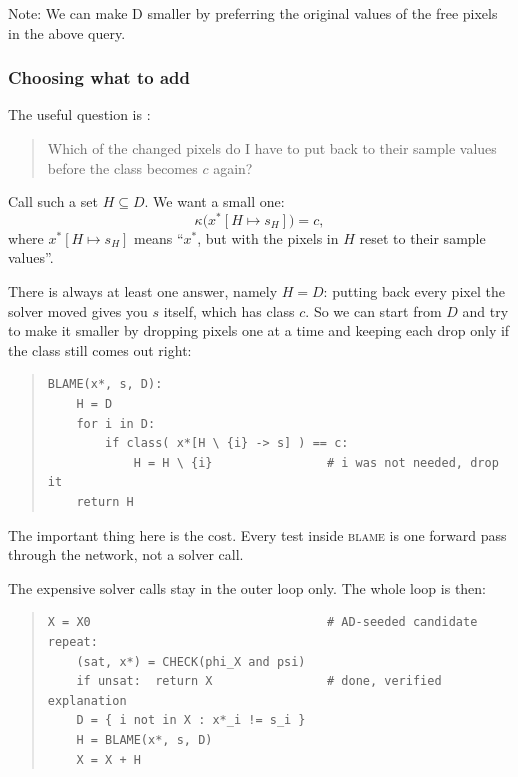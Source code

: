 \documentclass[11pt,a4paper]{article}
\begin{document}
Note: We can make D smaller by preferring the original values of the free pixels in the above query.



\subsubsection*{Choosing what to add}

The useful question is :

\begin{quote}
Which of the changed pixels do I have to put back to their sample values before
the class becomes $c$ again?
\end{quote}

Call such a set $H \subseteq D$. We want a small one:
\[
\kappa\big(x^\ast[H \mapsto s_H]\big) = c ,
\]
where $x^\ast[H \mapsto s_H]$ means ``$x^\ast$, but with the pixels in $H$ reset
to their sample values''.

There is always at least one answer, namely $H = D$: putting back every pixel
the solver moved gives you $s$ itself, which has class $c$. So we can start from
$D$ and try to make it smaller by dropping pixels one at a time and keeping each
drop only if the class still comes out right:

\begin{quote}\small
\begin{verbatim}
BLAME(x*, s, D):
    H = D
    for i in D:                        
        if class( x*[H \ {i} -> s] ) == c:
            H = H \ {i}                # i was not needed, drop it
    return H
\end{verbatim}
\end{quote}

\noindent
The important thing here is the cost. Every test inside \textsc{blame} is one
forward pass through the network, not a solver call.

The expensive solver calls stay
in the outer loop only. The whole loop is then:

\begin{quote}\small
\begin{verbatim}
X = X0                                 # AD-seeded candidate
repeat:
    (sat, x*) = CHECK(phi_X and psi)
    if unsat:  return X                # done, verified explanation
    D = { i not in X : x*_i != s_i }
    H = BLAME(x*, s, D)
    X = X + H
\end{verbatim}
\end{quote}
\end{document}
